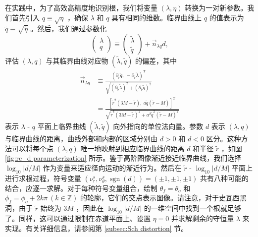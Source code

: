 \documentclass[aps,reprint,superscriptaddress,nofootinbib,floatfix,longbibliography,preprintnumbers]{revtex4-1}
\newcommand{\p}{\partial}
\begin{document}
在实践中，为了高效高精度地识别根，我们将变量    $(\lambda, \eta)$    转换为一对新参数。我们首先引入    $q \equiv \sqrt{\eta}$    ，确保    $\lambda$    和    $q$    具有相同的维数。临界曲线上    $q$    的值表示为    $\tilde{q} \equiv \sqrt{\tilde{\eta}}$    。然后，我们通过参数化
   \begin{equation}
    \begin{pmatrix}
        \lambda  \\ 
        q
    \end{pmatrix} \equiv \begin{pmatrix}
        \tilde{\lambda}  \\  
        \tilde{q}
    \end{pmatrix} + \vec{n}_{\lambda q} d,
\end{equation}    评估    $(\lambda, q)$    与其临界曲线对应物    $(\tilde{\lambda}, \tilde{q})$    的偏差，其中
   \begin{equation}
\begin{aligned}
        \vec{n}_{\lambda q} &\equiv \frac{(\p_{\tilde{r}}\tilde{q}, \  -\p_{\tilde{r}}\tilde{\lambda})^{\mathrm{T}}}{\sqrt{(\p_{\tilde{r}}\tilde{\lambda})^2+(\p_{\tilde{r}}\tilde{q})^2}}  \\  &= \frac{ \left[\tilde{r}^2(3M-\tilde{r}), \   a\tilde{q}(\tilde{r}-M)\right]^{\mathrm{T}}} {\sqrt{\tilde{r}^4(3M-\tilde{r})^2+a^2\tilde{q}^2(\tilde{r}-M)^2}}
\end{aligned}
\end{equation}    表示    $\lambda$    -    $q$    平面上临界曲线    $(\tilde{\lambda}, \tilde{q})$    向外指向的单位法向量。参数    $d$    表示    $(\lambda, q)$    与临界曲线的距离，曲线外部和内部的区域分别由    $d > 0$    和    $d < 0$    区分。这种方法可以将每个点    $(\lambda, q)$    唯一地映射到相应临界曲线的距离    $d$    和半径    $\tilde{r}$   ，如图~    \ref{fig:rc_d parameterization}    所示。鉴于高阶图像渐近接近临界曲线，我们选择    $\log_{10}|d/M|$    作为变量来适应径向运动的渐近行为。然后在    $\tilde{r}$    -    $\log_{10}|d/M|$    平面上进行求根过程，符号变量    $(\nu_r^s, \nu_{\theta}^s, \operatorname{sgn}(d)) = (\pm1, \pm1, \pm1)$    共有八种可能的结合，应逐一求解。对于每种符号变量组合，绘制    $\theta_f = \theta_o$    和    $\phi_f = \phi_o + 2k\pi \  (k\in\mathbb{Z})$    的轮廓，它们的交点表示图像。请注意，对于史瓦西黑洞，由于    $\tilde{r}$    始终为    $3M$    ，因此在    $\log_{10}|d/M|$    的一维空间中找到一个根就足够了。同样，这可以通过限制在赤道平面上、设置    $\eta = 0$    并求解剩余的守恒量    $\lambda$    来实现。有关详细信息，请参阅第    \ref{subsec:Sch distortion}    节。  
\end{document}
